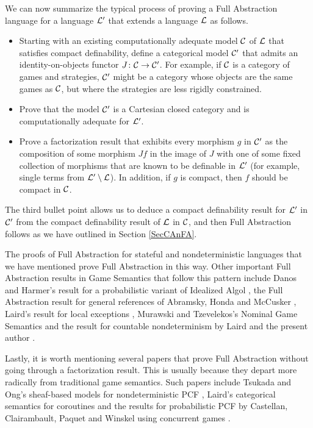 We can now summarize the typical process of proving a Full Abstraction language for a language $\mathcal L'$ that extends a language $\mathcal L$ as follows.
\begin{itemize}
  \item Starting with an existing computationally adequate model ${\mathcal{C}}$ of $\mathcal L$ that satisfies compact definability, define a categorical model ${\mathcal{C}}'$ that admits an identity-on-objects functor $J\colon {\mathcal{C}} \to {\mathcal{C}}'$.  
    For example, if ${\mathcal{C}}$ is a category of games and strategies, ${\mathcal{C}}'$ might be a category whose objects are the same games as ${\mathcal{C}}$, but where the strategies are less rigidly constrained.
  \item Prove that the model ${\mathcal{C}}'$ is a Cartesian closed category and is computationally adequate for $\mathcal L'$.
  \item Prove a factorization result that exhibits every morphism $g$ in ${\mathcal{C}}'$ as the composition of some morphism $Jf$ in the image of $J$ with one of some fixed collection of morphisms that are known to be definable in $\mathcal L'$ (for example, single terms from $\mathcal L'\setminus\mathcal L$).
    In addition, if $g$ is compact, then $f$ should be compact in ${\mathcal{C}}$.
\end{itemize}
The third bullet point allows us to deduce a compact definability result for $\mathcal L'$ in ${\mathcal{C}}'$ from the compact definability result of $\mathcal L$ in ${\mathcal{C}}$, and then Full Abstraction follows as we have outlined in Section \ref{SecCAnFA}.

The proofs of Full Abstraction for stateful and nondeterministic languages that we have mentioned \cite{SamsonGuyIAActive,mcCHFiniteND} prove Full Abstraction in this way.  
Other important Full Abstraction results in Game Semantics that follow this pattern include Danos and Harmer's result for a probabilistic variant of Idealized Algol \cite{DanosHarmer}, the Full Abstraction result for general references of Abramsky, Honda and McCusker \cite{HondaMcCusker}, Laird's result for local exceptions \cite{LLi}, Murawski and Tzevelekos's Nominal Game Semantics \cite{NGS} and the result for countable nondeterminism by Laird and the present author \cite{CslPaper}.

Lastly, it is worth mentioning several papers that prove Full Abstraction without going through a factorization result.  
This is usually because they depart more radically from traditional game semantics.  
Such papers include Tsukada and Ong's sheaf-based models for nondeterministic PCF \cite{TsukadaSheaves,Sheaves}, Laird's categorical semantics for coroutines \cite{FunctionalProgramsAsCoroutines} and the results for probabilistic PCF by Castellan, Clairambault, Paquet and Winskel using concurrent games \cite{PPCF}.

